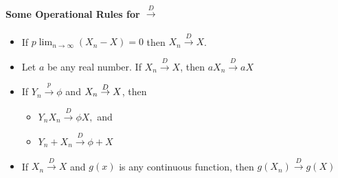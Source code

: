 \documentclass[notes=show,smaller,handout]{beamer}\usepackage[]{graphicx}\usepackage[]{color}
\begin{document}
\begin{frame}{\secname}
  \framesubtitle{Some Operational Rules for $\overset{D}{\rightarrow }$}

  \begin{itemize}

  \item If $p\lim_{n\rightarrow\infty}(X_n-X)=0$ then $X_{n}\overset{D}{\rightarrow }X$. \medskip
  \item Let $a$ be any real number. If $X_{n}\overset{D}{\rightarrow }X$, then
  $aX_{n}\overset{D}{\rightarrow }aX$ \medskip

  \item If $Y_{n}\overset{p}{\rightarrow }\phi $ and $X_{n}\overset{D}{%
  \rightarrow }X$, then \medskip

  \begin{itemize}
  \item $Y_{n}X_{n}\overset{D}{\rightarrow }\phi X,$ and \medskip

  \item $Y_{n}+X_{n}\overset{D}{\rightarrow }\phi +X$
  \end{itemize} \medskip

  \item If $X_{n}\overset{D}{\rightarrow }X$ and $g\left( x\right) $ is any
  continuous function, then $g\left( X_{n}\right) \overset{D}{\rightarrow }%
  g\left( X\right) $ \medskip


  \end{itemize}
\end{frame}
\end{document}
